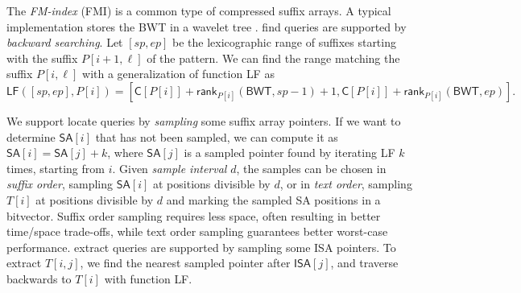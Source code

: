 \documentclass[a4paper,11pt]{llncs}
\newcommand{\SA}{\textsf{SA}}
\newcommand{\ISA}{\textsf{ISA}}
\newcommand{\BWT}{\textsf{BWT}}
\newcommand{\FMI}{\textsf{FMI}}
\newcommand{\mSA}{\ensuremath{\mathsf{SA}}}
\newcommand{\mISA}{\ensuremath{\mathsf{ISA}}}
\newcommand{\mBWT}{\ensuremath{\mathsf{BWT}}}
\newcommand{\mC}{\ensuremath{\mathsf{C}}}
\newcommand{\LF}{\textsf{LF}}
\newcommand{\find}{\textsf{find}}
\newcommand{\locate}{\textsf{locate}}
\newcommand{\extract}{\textsf{extract}}
\newcommand{\mLF}{\ensuremath{\mathsf{LF}}}
\newcommand{\mrank}{\ensuremath{\mathsf{rank}}}
\begin{document}
The \emph{FM-index} (\FMI) \cite{Ferragina2005a} is a common type of compressed suffix arrays. A typical implementation stores the \BWT{} in a wavelet tree \cite{Grossi2003}. \find{} queries are supported by \emph{backward searching}. Let $[sp,ep]$ be the lexicographic range of suffixes starting with the suffix $P[i+1,\ell]$ of the pattern. We can find the range matching the suffix $P[i,\ell]$ with a generalization of function \LF{} as
$$
\mLF([sp,ep],P[i]) =
[\mC[P[i]] + \mrank_{P[i]}(\mBWT, sp-1) + 1,
\mC[P[i]] + \mrank_{P[i]}(\mBWT, ep)].
$$

We support \locate{} queries by \emph{sampling} some suffix array pointers. If we want to determine $\mSA[i]$ that has not been sampled, we can compute it as $\mSA[i] = \mSA[j]+k$, where $\mSA[j]$ is a sampled pointer found by iterating \LF{} $k$ times, starting from $i$. Given \emph{sample interval} $d$, the samples can be chosen in \emph{suffix order}, sampling $\mSA[i]$ at positions divisible by $d$, or in \emph{text order}, sampling $T[i]$ at positions divisible by $d$ and marking the sampled \SA{} positions in a bitvector. Suffix order sampling requires less space, often resulting in better time/space trade-offs, while text order sampling guarantees better worst-case performance. \extract{} queries are supported by sampling some \ISA{} pointers. To extract $T[i,j]$, we find the nearest sampled pointer after $\mISA[j]$, and traverse backwards to $T[i]$ with function \LF.
\end{document}
